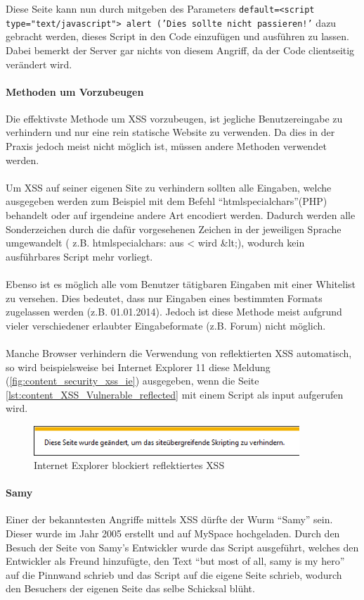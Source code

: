 Diese Seite kann nun durch mitgeben des Parameters  \texttt{default=<script type="text/javascript"> alert ('Dies sollte nicht passieren!'} dazu gebracht werden, dieses Script in den Code einzufügen und ausführen zu lassen. Dabei bemerkt der Server gar nichts von diesem Angriff, da der Code clientseitig verändert wird. 

\paragraph{Methoden um Vorzubeugen}

\label{sec:content_security_cross_site_scripting_Methods}
Die effektivste Methode um XSS vorzubeugen, ist jegliche Benutzereingabe zu verhindern und nur eine rein statische Website zu verwenden. Da dies in der Praxis jedoch meist nicht möglich ist, müssen andere Methoden verwendet werden.\\\\ 
Um XSS auf seiner eigenen Site zu verhindern sollten alle Eingaben, welche ausgegeben werden zum Beispiel mit dem Befehl \enquote{htmlspecialchars}(PHP) behandelt oder auf irgendeine andere Art encodiert werden. Dadurch werden alle Sonderzeichen durch die dafür vorgesehenen Zeichen in der jeweiligen Sprache umgewandelt ( z.B. htmlspecialchars: aus < wird \&lt;), wodurch kein ausführbares Script mehr vorliegt.\\\\
Ebenso ist es möglich alle vom Benutzer tätigbaren Eingaben mit einer Whitelist zu versehen. Dies bedeutet, dass nur Eingaben eines bestimmten Formats zugelassen werden (z.B. 01.01.2014). Jedoch ist diese Methode meist aufgrund vieler verschiedener erlaubter Eingabeformate (z.B. Forum) nicht möglich.\\\\
Manche Browser verhindern die Verwendung von reflektierten XSS automatisch, so wird beispielsweise bei Internet Explorer 11 diese Meldung (\autoref{fig:content_security_xss_ie}) ausgegeben, wenn die Seite \autoref{lst:content_XSS_Vulnerable_reflected} mit einem Script als input aufgerufen wird.

\begin{figure}[H]
\centering
\includegraphics[keepaspectratio=true, width=10cm]{images/screenshots/xss_ie.png}
\caption{Internet Explorer blockiert reflektiertes XSS}
\label{fig:content_security_xss_ie}
\end{figure}

\paragraph{Samy}
Einer der bekanntesten Angriffe mittels XSS dürfte der Wurm \enquote{Samy} sein. Dieser wurde im Jahr 2005 erstellt und auf MySpace hochgeladen. Durch den Besuch der Seite von Samy's Entwickler wurde das Script ausgeführt, welches den Entwickler als Freund hinzufügte, den Text \enquote{but most of all, samy is my hero} auf die Pinnwand schrieb und das Script auf die eigene Seite schrieb, wodurch den Besuchers der eigenen Seite das selbe Schicksal blüht.
